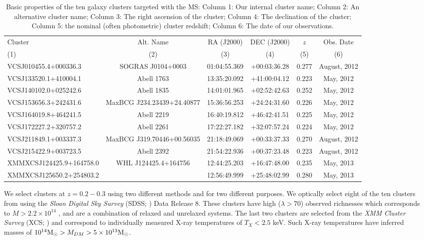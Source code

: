 \begin{landscape}
	\begin{table}
	\caption[Basic properties of the ten galaxy clusters targeted with the MS.]{Basic properties of the ten galaxy clusters targeted with the MS: Column 1: Our internal cluster name; Column 2: An alternative cluster name; Column 3: The right ascension of the cluster; Column 4: The declination of the cluster; Column 5: the nominal (often photometric) cluster redshift; Column 6: The date of our observations.} 
	\begin{tabular}{lccccc} 
		\hline 
		Cluster & Alt. Name & RA (J2000) & DEC (J2000) & $z$ & Obs. Date\\
		(1) & (2) & (3) & (4) & (5) & (6) \\
		\hline \hline
		VCSJ010455.4+000336.3 & SOGRAS J0104+0003 & 01:04:55.369 & +00:03:36.28 & 0.277 & August, 2012 \\
		VCSJ133520.1+410004.1 & Abell 1763 & 13:35:20.092 & +41:00:04.12 & 0.223 & May, 2012 \\
		VCSJ140102.0+025242.6 & Abell 1835 & 14:01:01.965 & +02:52:42.63 & 0.252 & May, 2012 \\
		VCSJ153656.3+242431.6 & MaxBCG J234.23439+24.40877 & 15:36:56.253 & +24:24:31.60 & 0.226 & May, 2012 \\ 
		VCSJ164019.8+464241.5 & Abell 2219 & 16:40:19.812 & +46:42:41.51 & 0.225 & May, 2012 \\
		VCSJ172227.2+320757.2 & Abell 2261 & 17:22:27.182 & +32:07:57.24 & 0.224 & May, 2012 \\
		VCSJ211849.1+003337.3 & MaxBCG J319.70446+00.56035 & 21:18:49.069 & +00:33:37.33 & 0.270 & August, 2012 \\
		VCSJ215422.9+003723.5 & Abell 2392 & 21:54:22.936 & +00:37:23.48 & 0.223 & August, 2012\\
		XMMXCSJ124425.9+164758.0 & WHL J124425.4+164756 & 12:44:25.203 & +16:47:48.00 & 0.235 & May, 2013 \\
		XMMXCSJ125650.2+254803.2 & \nd & 12:56:49.999 & +25:48:02.99 & 0.280 & May, 2013 \\
		\hline 
		\end{tabular}
		\label{2tbl:targets} 
	\end{table}
\end{landscape}

We select clusters at $z=0.2-0.3$ using two different methods and for two different purposes. We optically select eight of the ten clusters from \cite{Rykoff2012} using the \textit{Sloan Digital Sky Survey} (SDSS; \citealt{Blanton2001a}) Data Release 8. These clusters have high ($\lambda>70$) observed richnesses which corresponds to $M > 2.2\times10^{14}$ \Msol, and are a combination of relaxed and unrelaxed systems. The last two clusters are selected from the \textit{XMM Cluster Survey} (XCS; \citealt{Mehrtens2012}) and correspond to individually measured X-ray temperatures of $T_X < 2.5$ keV. Such X-ray temperatures have inferred masses of $10^{14}\hbox{$\mathrm{M}_\odot$} > M_{DM} > 5\times10^{13}\hbox{$\mathrm{M}_\odot$}$.

